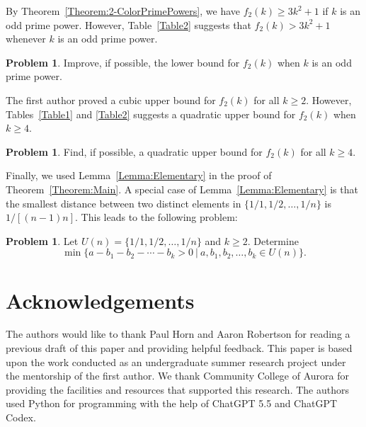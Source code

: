 \documentclass[11pt]{article}
\theoremstyle{definition}
\newtheorem{problem}[theorem]{Problem}
\begin{document}
By Theorem~\ref{Theorem:2-ColorPrimePowers}, we have $f_2(k)\geq3k^2+1$ if $k$ is an odd prime power. However, Table~\ref{Table2} suggests that $f_2(k)>3k^2+1$ whenever $k$ is an odd prime power.

\begin{problem}
    Improve, if possible, the lower bound for $f_2(k)$ when $k$ is an odd prime power.
\end{problem}

The first author \cite{Gaiser2024} proved a cubic upper bound for $f_2(k)$ for all $k\geq2$. However, Tables~\ref{Table1} and \ref{Table2} suggests a quadratic upper bound for $f_2(k)$ when $k\geq4$.

\begin{problem}
    Find, if possible, a quadratic upper bound for $f_2(k)$ for all $k\geq4$.
\end{problem}

Finally, we used Lemma~\ref{Lemma:Elementary} in the proof of Theorem~\ref{Theorem:Main}. A special case of Lemma~\ref{Lemma:Elementary} is that the smallest distance between two distinct elements in $\{1/1,1/2,\ldots,1/n\}$ is $1/[(n-1)n]$. This leads to the following problem:

\begin{problem}\label{Problem:UnitFractionDistance}
    Let $U(n)=\{1/1,1/2,\ldots,1/n\}$ and $k\geq2$. Determine
    \[
    \min\{a-b_1-b_2-\cdots-b_k>0\ |\ a,b_1,b_2,\ldots,b_k\in U(n)\}. 
    \]
\end{problem}





\section*{Acknowledgements}
The authors would like to thank Paul Horn and Aaron Robertson for reading a previous draft of this paper and providing helpful feedback. This paper is based upon the work conducted as an undergraduate summer research project under the mentorship of the first author. We thank Community College of Aurora for providing the facilities and resources that supported this research. The authors used Python for programming with the help of ChatGPT 5.5 and ChatGPT Codex.
\end{document}
